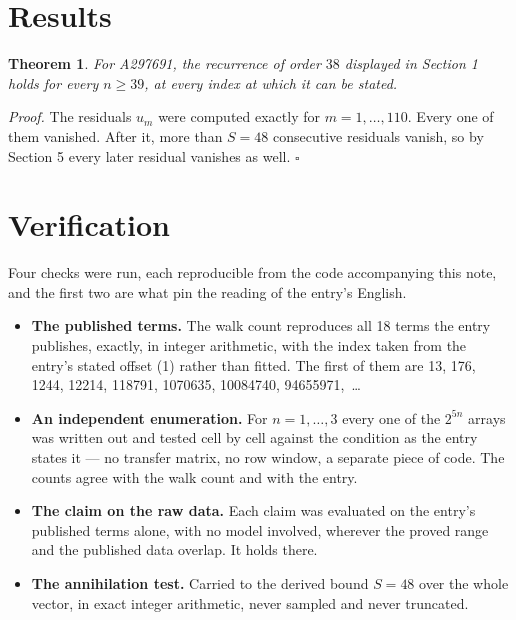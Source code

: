 \documentclass[11pt]{article}
\newtheorem{theorem}{Theorem}
\theoremstyle{definition}
\begin{document}
\section{Results}

\begin{theorem} For A297691, the recurrence of order $38$ displayed in Section 1 holds for every $n \ge 39$, at every index at which it can be stated.\end{theorem}

{\itshape Proof.} The residuals $u_m$ were computed exactly for $m = 1,\dots,110$. Every one of them vanished. After it, more than $S = 48$ consecutive residuals vanish, so by Section 5 every later residual vanishes as well. $\square$

\section{Verification}

Four checks were run, each reproducible from the code accompanying this note, and the first two are what pin the reading of the entry's English.

\begin{itemize}

\item {\bfseries The published terms.} The walk count reproduces all 18 terms the entry publishes, exactly, in integer arithmetic, with the index taken from the entry's stated offset (1) rather than fitted. The first of them are 13, 176, 1244, 12214, 118791, 1070635, 10084740, 94655971,~\dots

\item {\bfseries An independent enumeration.} For $n = 1,\dots,3$ every one of the $2^{5n}$ arrays was written out and tested cell by cell against the condition as the entry states it --- no transfer matrix, no row window, a separate piece of code. The counts agree with the walk count and with the entry.

\item {\bfseries The claim on the raw data.} Each claim was evaluated on the entry's published terms alone, with no model involved, wherever the proved range and the published data overlap. It holds there.

\item {\bfseries The annihilation test.} Carried to the derived bound $S = 48$ over the whole vector, in exact integer arithmetic, never sampled and never truncated.

\end{itemize}
\end{document}
